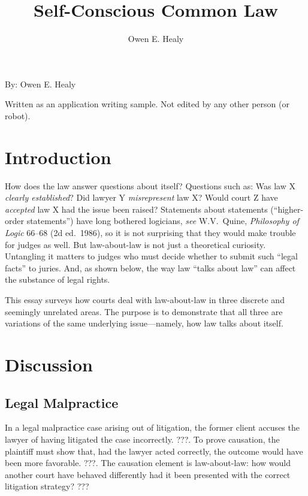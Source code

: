 \documentclass[
  12pt,
  letterpaper,
]{scrartcl}
\title{Self-Conscious Common Law}
\author{Owen E. Healy}
\begin{document}
\begin{center}\end{center}
  
\vspace{10pt}\noindent\begin{minipage}{4in}
  \setlength{\parskip}{6pt}
  
  \noindent By: Owen E. Healy

  \noindent Written as an application writing sample. Not edited by any other person (or robot).
\end{minipage}


\vspace{12pt}\section{Introduction}

How does the law answer questions about itself? Questions such as: Was law X
\emph{clearly established}? Did lawyer Y \emph{misrepresent} law X? Would court
Z have \emph{accepted} law X had the issue been raised? Statements about
statements (``higher-order statements'') have long bothered logicians,
\textit{see} W.V.~Quine, \textit{Philosophy of Logic} 66--68 (2d ed.~1986), so
it is not surprising that they would make trouble for judges as well. But
law-about-law is not just a theoretical curiosity. Untangling it matters to
judges who must decide whether to submit such ``legal facts'' to juries. And,
as shown below, the way law ``talks about law'' can affect the substance of
legal rights.

This essay surveys how courts deal with law-about-law in three discrete and
seemingly unrelated areas. The purpose is to demonstrate that all three are
variations of the same underlying issue---namely, how law talks about itself.


\section{Discussion}


\subsection{Legal Malpractice}

In a legal malpractice case arising out of litigation, the former client
accuses the lawyer of having litigated the case incorrectly. ???. To prove
causation, the plaintiff must show that, had the lawyer acted correctly, the
outcome would have been more favorable. ???. The causation element is
law-about-law: how would another court have behaved differently had it been
presented with the correct litigation strategy? ???
\end{document}
